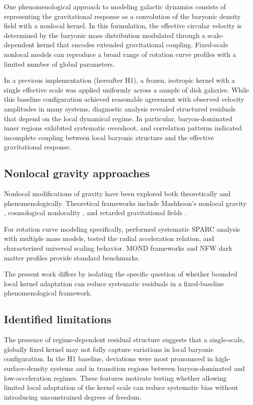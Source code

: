 \documentclass{aa}
\begin{document}
One phenomenological approach to modeling galactic dynamics consists of 
representing the gravitational response as a convolution of the baryonic 
density field with a nonlocal kernel. In this formulation, the effective 
circular velocity is determined by the baryonic mass distribution modulated 
through a scale-dependent kernel that encodes extended gravitational coupling. 
Fixed-scale nonlocal models can reproduce a broad range of rotation curve 
profiles with a limited number of global parameters.

In a previous implementation (hereafter H1), a frozen, isotropic kernel with 
a single effective scale was applied uniformly across a sample of disk 
galaxies. While this baseline configuration achieved reasonable agreement 
with observed velocity amplitudes in many systems, diagnostic analysis 
revealed structured residuals that depend on the local dynamical regime. 
In particular, baryon-dominated inner regions exhibited systematic overshoot, 
and correlation patterns indicated incomplete coupling between local baryonic 
structure and the effective gravitational response.
\subsection{Nonlocal gravity approaches}

Nonlocal modifications of gravity have been explored both theoretically 
and phenomenologically. Theoretical frameworks include Mashhoon's nonlocal 
gravity \citep{mashhoon2007,hehl2009}, cosmological nonlocality 
\citep{deser2007,deffayet2009}, and retarded gravitational fields 
\citep{chicone2016}. 

For rotation curve modeling specifically, \citet{li2018} performed 
systematic SPARC analysis with multiple mass models, \citet{rodrigues2018} 
tested the radial acceleration relation, and \citet{lelli2017} characterized 
universal scaling behavior. MOND frameworks \citep{milgrom1983,famaey2012} 
and NFW dark matter profiles \citep{nfw1997} provide standard benchmarks.

The present work differs by isolating the specific question of whether 
bounded local kernel adaptation can reduce systematic residuals in a 
fixed-baseline phenomenological framework.
\subsection{Identified limitations}

The presence of regime-dependent residual structure suggests that a 
single-scale, globally fixed kernel may not fully capture variations in 
local baryonic configuration. In the H1 baseline, deviations were most 
pronounced in high-surface-density systems and in transition regions between 
baryon-dominated and low-acceleration regimes. These features motivate 
testing whether allowing limited local adaptation of the kernel scale can 
reduce systematic bias without introducing unconstrained degrees of freedom.
\end{document}
